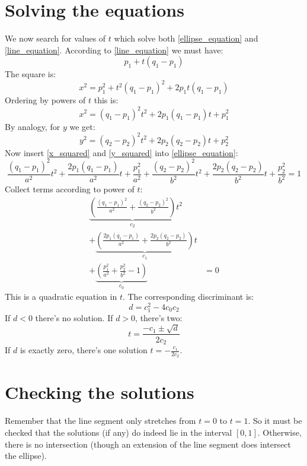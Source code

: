 \documentclass[12pt, a4paper]{article}
\numberwithin{equation}{section}
\begin{document}
\section{Solving the equations}
We now search for values of $t$ which solve both \ref{ellipse_equation} and \ref{line_equation}. According to \ref{line_equation} we must have:
\begin{equation}
p_1 + t(q_1-p_1)
\end{equation}
The square is:
\begin{equation}
x^2=p_1^2+t^2(q_1-p_1)^2+2p_1t(q_1-p_1)
\end{equation}
Ordering by powers of $t$ this is:
\begin{equation}
\label{x_squared}
x^2=(q_1-p_1)^2t^2+2p_1(q_1-p_1)t+p_1^2
\end{equation}
By analogy, for $y$ we get:
\begin{equation}
\label{y_squared}
y^2=(q_2-p_2)^2t^2+2p_2(q_2-p_2)t+p_2^2
\end{equation}
Now insert \ref{x_squared} and \ref{y_squared} into \ref{ellipse_equation}:
\begin{equation}
\frac{(q_1-p_1)^2}{a^2}t^2+\frac{2p_1(q_1-p_1)}{a^2}t+\frac{p_1^2}{a^2}+\frac{(q_2-p_2)^2}{b^2}t^2+\frac{2p_2(q_2-p_2)}{b^2}t+\frac{p_2^2}{b^2}=1
\end{equation}
Collect terms according to power of $t$:
\begin{align}
\underbrace{\left(\frac{(q_1-p_1)^2}{a^2}+\frac{(q_2-p_2)^2}{b^2}\right)}_{c_2}t^2 &\\
+\underbrace{\left(\frac{2p_1(q_1-p_1)}{a^2}+\frac{2p_2(q_2-p_2)}{b^2}\right)}_{c_1}t &\\
+\underbrace{\left(\frac{p_1^2}{a^2}+\frac{p_2^2}{b^2}-1\right)}_{c_0} & = 0
\end{align}
This is a quadratic equation in $t$. The corresponding discriminant is:
\begin{equation}
d=c_1^2-4c_0c_2
\end{equation}
If $d<0$ there's no solution. If $d>0$, there's two:
\begin{equation}
t=\frac{-c_1\pm\sqrt{d}}{2c_2}
\end{equation}
If $d$ is exactly zero, there's one solution $t=-\frac{c_1}{2c_2}$.

\section{Checking the solutions}
Remember that the line segment only stretches from $t=0$ to $t=1$. So it must be checked that the solutions (if any) do indeed lie in the interval $[0,1]$. Otherwise, there is no intersection (though an extension of the line segment does intersect the ellipse).
\end{document}
